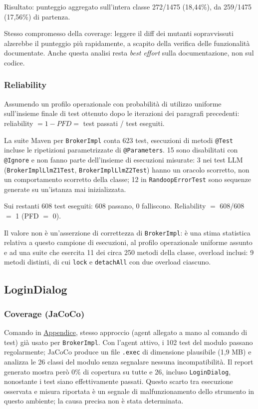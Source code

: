 Risultato: punteggio aggregato sull'intera classe 272/1475 (18,44\%), da 259/1475 (17,56\%) di
partenza.

Stesso compromesso della coverage: leggere il diff dei mutanti sopravvissuti alzerebbe il
punteggio più rapidamente, a scapito della verifica delle funzionalità documentate. Anche questa
analisi resta \textit{best effort} sulla documentazione, non sul codice.

\subsubsection{Reliability}

Assumendo un profilo operazionale con probabilità di utilizzo
uniforme sull'insieme finale di test ottenuto dopo le iterazioni dei paragrafi precedenti:
reliability $= 1 - PFD =$ test passati / test eseguiti.

La suite Maven per \texttt{BrokerImpl} conta 623 test, esecuzioni di metodi \texttt{@Test}
incluse le ripetizioni parametrizzate di \texttt{@Parameters}. 15 sono disabilitati con
\texttt{@Ignore} e non fanno parte dell'insieme di esecuzioni misurate: 3 nei test LLM
(\texttt{BrokerImplLlmZ1Test}, \texttt{BrokerImplLlmZ2Test}) hanno un oracolo scorretto, non un
comportamento scorretto della classe; 12 in \texttt{RandoopErrorTest} sono sequenze
generate su un'istanza mai inizializzata.

Sui restanti 608 test eseguiti: 608 passano, 0 falliscono. Reliability $=$ 608/608 $=$ 1
(PFD $=$ 0).

Il valore non è un'asserzione di correttezza di \texttt{BrokerImpl}: è una stima statistica
relativa a questo campione di esecuzioni, al profilo operazionale uniforme assunto e
ad una suite che esercita 11 dei circa 250 metodi della classe, overload inclusi: 9 metodi
distinti, di cui \texttt{lock} e \texttt{detachAll} con due overload ciascuno.

\subsection{LoginDialog}

\subsubsection{Coverage (JaCoCo)}

Comando in \hyperref[cmd:jacoco-logindialog]{Appendice}, stesso approccio (agent allegato a
mano al comando di test) già usato per \texttt{BrokerImpl}. Con l'agent attivo, i 102 test del
modulo passano regolarmente; JaCoCo produce un file \texttt{.exec} di dimensione plausibile
(1,9 MB) e analizza le 26 classi del modulo senza segnalare nessuna incompatibilità. Il report
generato mostra però $0\%$ di copertura su tutte e 26, incluso \texttt{LoginDialog}, nonostante
i test siano effettivamente passati. Questo scarto tra esecuzione osservata e misura riportata è
un segnale di malfunzionamento dello strumento in questo ambiente; la causa precisa non è stata
determinata.

